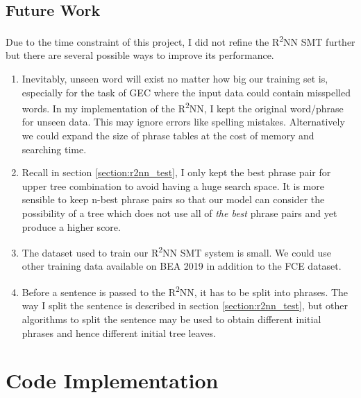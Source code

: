 \documentclass[12pt,a4paper,twoside,openright]{report}
\begin{document}
\section{Future Work}
Due to the time constraint of this project, I did not refine the R\textsuperscript{2}NN SMT further but there are several possible ways to improve its performance.

\begin{enumerate}
    \item Inevitably, unseen word will exist no matter how big our training set is, especially for the task of GEC where the input data could contain misspelled words. In my implementation of the R\textsuperscript{2}NN, I kept the original word/phrase for unseen data. This may ignore errors like spelling mistakes. Alternatively we could expand the size of phrase tables at the cost of memory and searching time.
    
    \item Recall in section \ref{section:r2nn_test}, I only kept the best phrase pair for upper tree combination to avoid having a huge search space. It is more sensible to keep n-best phrase pairs so that our model can consider the possibility of a tree which does not use all of \textit{the best} phrase pairs and yet produce a higher score.
    
    \item The dataset used to train our R\textsuperscript{2}NN SMT system is small. We could use other training data available on BEA 2019\cite{bryant-etal-2019-bea} in addition to the FCE dataset.
    
    \item Before a sentence is passed to the R\textsuperscript{2}NN, it has to be split into phrases. The way I split the sentence is described in section \ref{section:r2nn_test}, but other algorithms to split the sentence may be used to obtain different initial phrases and hence different initial tree leaves.
\end{enumerate}




\appendix

\chapter{Code Implementation}
\end{document}
